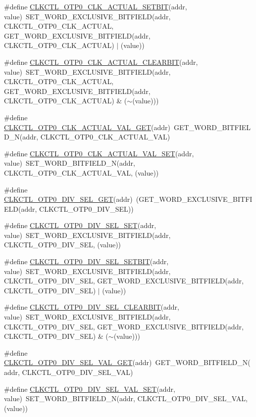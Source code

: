 \begin{DoxyCompactItemize}
\item 
\#define \hyperlink{a00544_a38d11c7f1e0f219b2cc90f015cc47e67}{CLKCTL\_\-OTP0\_\-CLK\_\-ACTUAL\_\-SETBIT}(addr, value)~SET\_\-WORD\_\-EXCLUSIVE\_\-BITFIELD(addr, CLKCTL\_\-OTP0\_\-CLK\_\-ACTUAL, GET\_\-WORD\_\-EXCLUSIVE\_\-BITFIELD(addr, CLKCTL\_\-OTP0\_\-CLK\_\-ACTUAL) $|$ (value))
\item 
\#define \hyperlink{a00544_a270135a0ad9db3cd13416b3822ff8a69}{CLKCTL\_\-OTP0\_\-CLK\_\-ACTUAL\_\-CLEARBIT}(addr, value)~SET\_\-WORD\_\-EXCLUSIVE\_\-BITFIELD(addr, CLKCTL\_\-OTP0\_\-CLK\_\-ACTUAL, GET\_\-WORD\_\-EXCLUSIVE\_\-BITFIELD(addr, CLKCTL\_\-OTP0\_\-CLK\_\-ACTUAL) \& ($\sim$(value)))
\item 
\#define \hyperlink{a00544_a4d1a77601024d2d09a32606c1ffc60f2}{CLKCTL\_\-OTP0\_\-CLK\_\-ACTUAL\_\-VAL\_\-GET}(addr)~GET\_\-WORD\_\-BITFIELD\_\-N(addr, CLKCTL\_\-OTP0\_\-CLK\_\-ACTUAL\_\-VAL)
\item 
\#define \hyperlink{a00544_a5845a5a547e3e9310d54fadfec1639db}{CLKCTL\_\-OTP0\_\-CLK\_\-ACTUAL\_\-VAL\_\-SET}(addr, value)~SET\_\-WORD\_\-BITFIELD\_\-N(addr, CLKCTL\_\-OTP0\_\-CLK\_\-ACTUAL\_\-VAL, (value))
\item 
\#define \hyperlink{a00544_a9d561fb93a6a6e5eab6c9adc53bb79be}{CLKCTL\_\-OTP0\_\-DIV\_\-SEL\_\-GET}(addr)~(GET\_\-WORD\_\-EXCLUSIVE\_\-BITFIELD(addr, CLKCTL\_\-OTP0\_\-DIV\_\-SEL))
\item 
\#define \hyperlink{a00544_abba094227cdb7e1d04124325d9e3c1d2}{CLKCTL\_\-OTP0\_\-DIV\_\-SEL\_\-SET}(addr, value)~SET\_\-WORD\_\-EXCLUSIVE\_\-BITFIELD(addr, CLKCTL\_\-OTP0\_\-DIV\_\-SEL, (value))
\item 
\#define \hyperlink{a00544_a05aa5015a10e2b269cc328927a8294b9}{CLKCTL\_\-OTP0\_\-DIV\_\-SEL\_\-SETBIT}(addr, value)~SET\_\-WORD\_\-EXCLUSIVE\_\-BITFIELD(addr, CLKCTL\_\-OTP0\_\-DIV\_\-SEL, GET\_\-WORD\_\-EXCLUSIVE\_\-BITFIELD(addr, CLKCTL\_\-OTP0\_\-DIV\_\-SEL) $|$ (value))
\item 
\#define \hyperlink{a00544_ab103929e96e84f9ab9ec2ba942539374}{CLKCTL\_\-OTP0\_\-DIV\_\-SEL\_\-CLEARBIT}(addr, value)~SET\_\-WORD\_\-EXCLUSIVE\_\-BITFIELD(addr, CLKCTL\_\-OTP0\_\-DIV\_\-SEL, GET\_\-WORD\_\-EXCLUSIVE\_\-BITFIELD(addr, CLKCTL\_\-OTP0\_\-DIV\_\-SEL) \& ($\sim$(value)))
\item 
\#define \hyperlink{a00544_ade0fbc1982297a889fa784e45dee0b9c}{CLKCTL\_\-OTP0\_\-DIV\_\-SEL\_\-VAL\_\-GET}(addr)~GET\_\-WORD\_\-BITFIELD\_\-N(addr, CLKCTL\_\-OTP0\_\-DIV\_\-SEL\_\-VAL)
\item 
\#define \hyperlink{a00544_ac57e4bc15259d5c4efdb2df828f7b832}{CLKCTL\_\-OTP0\_\-DIV\_\-SEL\_\-VAL\_\-SET}(addr, value)~SET\_\-WORD\_\-BITFIELD\_\-N(addr, CLKCTL\_\-OTP0\_\-DIV\_\-SEL\_\-VAL, (value))

\end{DoxyCompactItemize}
